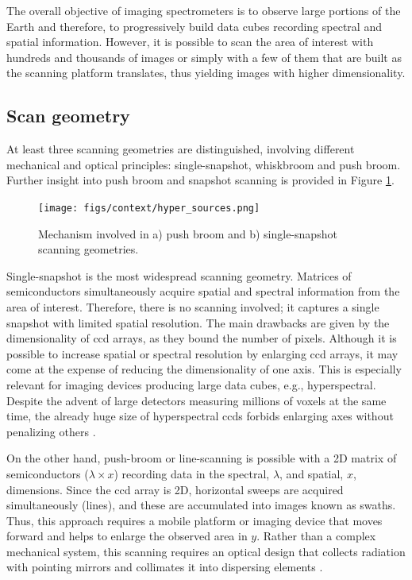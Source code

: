 The overall objective of imaging spectrometers is to observe large portions of the Earth and therefore, to progressively build data cubes recording spectral and spatial information. However, it is possible to scan the area of interest with hundreds and thousands of images or simply with a few of them that are built as the scanning platform translates, thus yielding images with higher dimensionality.

\subsection{Scan geometry}
\label{sec:fundamentals_optical_imaging_geometry}

At least three scanning geometries are distinguished, involving different mechanical and optical principles: single-snapshot, whiskbroom and push broom. Further insight into push broom and snapshot scanning is provided in Figure \ref{fig:hyper_scan_geometry}. 

\begin{figure}[!ht]
	\texttt{[image: figs/context/hyper\_sources.png]}
	\caption{Mechanism involved in a) push broom and b) single-snapshot scanning geometries.}
    \label{fig:hyper_scan_geometry}
\end{figure}

Single-snapshot is the most widespread scanning geometry. Matrices of semiconductors simultaneously acquire spatial and spectral information from the area of interest. Therefore, there is no scanning involved; it captures a single snapshot with limited spatial resolution. The main drawbacks are given by the dimensionality of \acrshort{ccd} arrays, as they bound the number of pixels. Although it is possible to increase spatial or spectral resolution by enlarging \acrshort{ccd} arrays, it may come at the expense of reducing the dimensionality of one axis. This is especially relevant for imaging devices producing large data cubes, e.g., hyperspectral. Despite the advent of large detectors measuring millions of voxels at the same time, the already huge size of hyperspectral \acrshort{ccd}s forbids enlarging axes without penalizing others \cite{sousa_uav-based_2022, pu_hyperspectral_2017}. 

On the other hand, push-broom or line-scanning is possible with a 2D matrix of semiconductors ($\lambda \times x$) recording data in the spectral, $\lambda$, and spatial, $x$, dimensions. Since the \acrshort{ccd} array is 2D, horizontal sweeps are acquired simultaneously (lines), and these are accumulated into images known as swaths. Thus, this approach requires a mobile platform or imaging device that moves forward and helps to enlarge the observed area in $y$. Rather than a complex mechanical system, this scanning requires an optical design that collects radiation with pointing mirrors and collimates it into dispersing elements \cite{sousa_uav-based_2022, pu_hyperspectral_2017}. 

